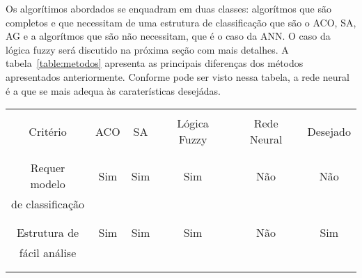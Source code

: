 Os algorítimos abordados se enquadram em duas classes: algorítmos que são
completos e que necessitam de uma estrutura de classificação que são o ACO, SA,
AG e a algorítmos que são não necessitam, que é o caso da ANN\@. O caso da
lógica fuzzy será discutido na próxima seção com mais detalhes. A
tabela~\ref{table:metodos} apresenta as principais diferenças dos métodos
apresentados anteriormente. Conforme pode ser visto nessa tabela, a rede neural
é a que se mais adequa às caraterísticas desejádas.




 \begin{table}
   \begin{center}
     \begin{tabular}{|c|c|c|c|c|c|}
       \hline
                         &          &           &              &             &          \\
       Critério          &  ACO     &    SA     & Lógica Fuzzy & Rede Neural & Desejado \\
                         &          &           &              &             &          \\
       \hline                                                                           
                         &          &           &              &             &          \\
       Requer modelo     &   Sim    &    Sim    &     Sim      &    Não      &   Não    \\
       de classificação  &          &           &              &             &          \\
                         &          &           &              &             &          \\
       \hline                                                                           
                         &          &           &              &             &          \\
       Estrutura de      &   Sim    &    Sim    &     Sim      &    Não      &   Sim    \\
       fácil análise     &          &           &              &             &          \\
                         &          &           &              &             &          \\
       \hline                                                                           
                         &          &           &              &             &          \\

\end{tabular}
\end{center}
\end{table}
